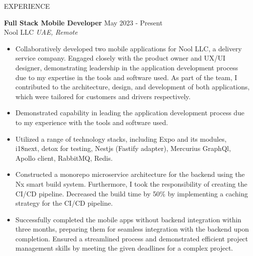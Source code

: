 \documentclass{resume} %
\begin{document}
\begin{rSection}{EXPERIENCE}

\textbf{Full Stack Mobile Developer} \hfill May 2023 - Present\\
Nool LLC \hfill \textit{UAE, Remote}
 \begin{itemize}
    \itemsep -3pt {} 
        \item Collaboratively developed two mobile applications for Nool LLC, a delivery service company. Engaged closely with the product owner and UX/UI designer, demonstrating leadership in the application development process due to my expertise in the tools and software used. As part of the team, I contributed to the architecture, design, and development of both applications, which were tailored for customers and drivers respectively.
        \item Demonstrated capability in leading the application development process due to my experience with the tools and software used.
        \item Utilized a range of technology stacks, including Expo and its modules, i18next, detox for testing, Nestjs (Fastify adapter), Mercurius GraphQl, Apollo client, RabbitMQ, Redis.
        \item Constructed a monorepo microservice architecture for the backend using the Nx smart build system. Furthermore, I took the responsibility of creating the CI/CD pipeline. Decreased the build time by 50\% by implementing a caching strategy for the CI/CD pipeline. 
        \item Successfully completed the mobile apps without backend integration within three months, preparing them for seamless integration with the backend upon completion. Ensured a streamlined process and demonstrated efficient project management skills by meeting the given deadlines for a complex project.
 \end{itemize}


\end{rSection}
\end{document}
